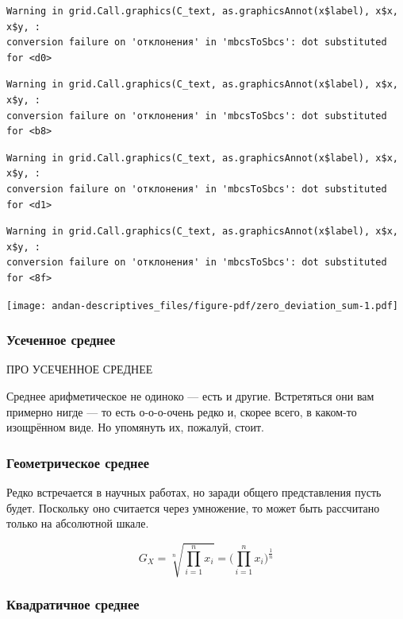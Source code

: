 \documentclass[
  letterpaper,
  DIV=11,
  numbers=noendperiod]{scrreprt}
\theoremstyle{definition}
\theoremstyle{remark}
\begin{document}
\begin{verbatim}
Warning in grid.Call.graphics(C_text, as.graphicsAnnot(x$label), x$x, x$y, :
conversion failure on 'отклонения' in 'mbcsToSbcs': dot substituted for <d0>
\end{verbatim}

\begin{verbatim}
Warning in grid.Call.graphics(C_text, as.graphicsAnnot(x$label), x$x, x$y, :
conversion failure on 'отклонения' in 'mbcsToSbcs': dot substituted for <b8>
\end{verbatim}

\begin{verbatim}
Warning in grid.Call.graphics(C_text, as.graphicsAnnot(x$label), x$x, x$y, :
conversion failure on 'отклонения' in 'mbcsToSbcs': dot substituted for <d1>
\end{verbatim}

\begin{verbatim}
Warning in grid.Call.graphics(C_text, as.graphicsAnnot(x$label), x$x, x$y, :
conversion failure on 'отклонения' in 'mbcsToSbcs': dot substituted for <8f>
\end{verbatim}

\texttt{[image: andan-descriptives\_files/figure-pdf/zero\_deviation\_sum-1.pdf]}

\subsubsection{Усеченное среднее}\label{andan-descriptives-trimmed-mean}

ПРО УСЕЧЕННОЕ СРЕДНЕЕ

Среднее арифметическое не одиноко --- есть и другие. Встретяться они вам
примерно нигде --- то есть о-о-о-очень редко и, скорее всего, в каком-то
изощрённом виде. Но упомянуть их, пожалуй, стоит.

\subsubsection{Геометрическое
среднее}\label{andan-descriptives-geometric-mean}

Редко встречается в научных работах, но заради общего представления
пусть будет. Поскольку оно считается через умножение, то может быть
рассчитано только на абсолютной шкале.

\[
G_{X} = \sqrt[n]{\prod_{i=1}^n x_i} = \Big(\prod_{i=1}^n x_i\Big)^{\tfrac{1}{n}}
\]

\subsubsection{Квадратичное
среднее}\label{andan-descriptives-quandratic-mean}
\end{document}
